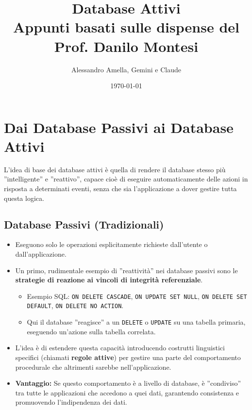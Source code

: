 

\usepackage{hyperref}

\title{Database Attivi\\
  \large Appunti basati sulle dispense del Prof. Danilo Montesi}
\author{Alessandro Amella, Gemini e Claude}
\date{\today}


	
	\maketitle
	\tableofcontents
	\newpage
	
	\section{Dai Database Passivi ai Database Attivi}
	L'idea di base dei database attivi è quella di rendere il database stesso più ''intelligente'' e ''reattivo'', capace cioè di eseguire automaticamente delle azioni in risposta a determinati eventi, senza che sia l'applicazione a dover gestire tutta questa logica.
	
	\subsection{Database Passivi (Tradizionali)}
	\begin{itemize}
		\item Eseguono solo le operazioni esplicitamente richieste dall'utente o dall'applicazione.
		\item Un primo, rudimentale esempio di ''reattività'' nei database passivi sono le \textbf{strategie di reazione ai vincoli di integrità referenziale}.
		\begin{itemize}
			\item Esempio SQL: \texttt{ON DELETE CASCADE}, \texttt{ON UPDATE SET NULL}, \texttt{ON DELETE SET DEFAULT}, \texttt{ON DELETE NO ACTION}.
			\item Qui il database ''reagisce'' a un \texttt{DELETE} o \texttt{UPDATE} su una tabella primaria, eseguendo un'azione sulla tabella correlata.
		\end{itemize}
		\item L'idea è di estendere questa capacità introducendo costrutti linguistici specifici (chiamati \textbf{regole attive}) per gestire una parte del comportamento procedurale che altrimenti sarebbe nell'applicazione.
		\item \textbf{Vantaggio:} Se questo comportamento è a livello di database, è ''condiviso'' tra tutte le applicazioni che accedono a quei dati, garantendo consistenza e promuovendo l'indipendenza dei dati.
	\end{itemize}
	
